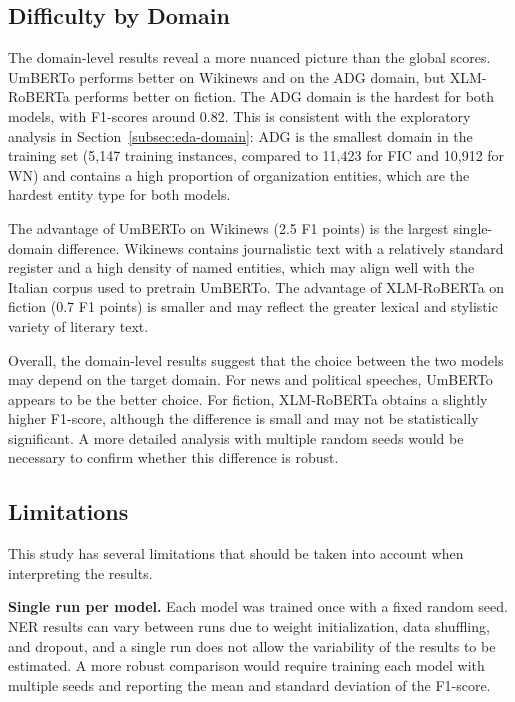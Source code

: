 \subsection{Difficulty by Domain}
\label{subsec:disc-domain}

The domain-level results reveal a more nuanced picture than the global scores. UmBERTo performs better on Wikinews and on the ADG domain, but XLM-RoBERTa performs better on fiction. The ADG domain is the hardest for both models, with F1-scores around 0.82. This is consistent with the exploratory analysis in Section~\ref{subsec:eda-domain}: ADG is the smallest domain in the training set (5,147 training instances, compared to 11,423 for FIC and 10,912 for WN) and contains a high proportion of organization entities, which are the hardest entity type for both models.

The advantage of UmBERTo on Wikinews (2.5 F1 points) is the largest single-domain difference. Wikinews contains journalistic text with a relatively standard register and a high density of named entities, which may align well with the Italian corpus used to pretrain UmBERTo. The advantage of XLM-RoBERTa on fiction (0.7 F1 points) is smaller and may reflect the greater lexical and stylistic variety of literary text.

Overall, the domain-level results suggest that the choice between the two models may depend on the target domain. For news and political speeches, UmBERTo appears to be the better choice. For fiction, XLM-RoBERTa obtains a slightly higher F1-score, although the difference is small and may not be statistically significant. A more detailed analysis with multiple random seeds would be necessary to confirm whether this difference is robust.

\subsection{Limitations}
\label{subsec:disc-limitations}

This study has several limitations that should be taken into account when interpreting the results.

\textbf{Single run per model.} Each model was trained once with a fixed random seed. NER results can vary between runs due to weight initialization, data shuffling, and dropout, and a single run does not allow the variability of the results to be estimated. A more robust comparison would require training each model with multiple seeds and reporting the mean and standard deviation of the F1-score.

